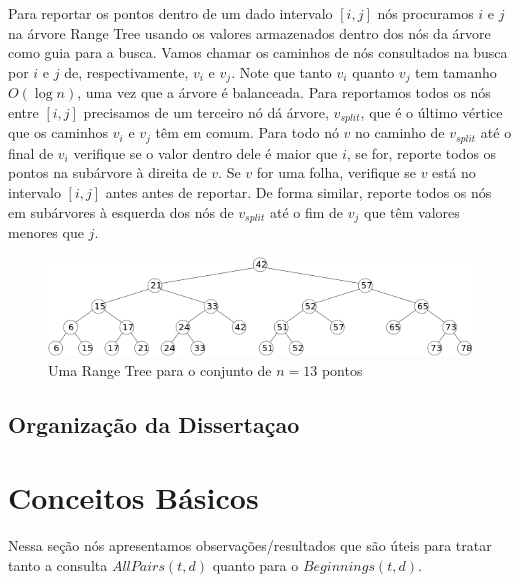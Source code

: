 \documentclass[12pt]{article}
\begin{document}
Para reportar os pontos dentro de um dado intervalo
$[i, j]$ nós procuramos $i$ e $j$ na árvore Range Tree usando 
os valores armazenados dentro dos nós da árvore como guia para a busca.
Vamos chamar os caminhos de nós consultados na busca por $i$ e $j$
de, respectivamente, $v_i$ e $v_j$. Note que tanto $v_i$ quanto $v_j$
tem tamanho $O(\log n)$, uma vez que a árvore é balanceada. Para
reportamos todos os nós entre $[i, j]$ precisamos de um terceiro nó
dá árvore, $v_{split}$, que é o último vértice que os caminhos $v_i$
e $v_j$ têm em comum. Para todo nó $v$ no caminho de $v_{split}$ até o 
final de $v_i$ verifique se o valor dentro dele é maior que $i$, se 
for, reporte todos os pontos na subárvore à direita de $v$. Se $v$
for uma folha, verifique se $v$ está no intervalo $[i, j]$ antes
antes de reportar. De forma similar, reporte todos os nós em 
subárvores à esquerda dos nós de $v_{split}$ até o fim de $v_j$
que têm valores menores que $j$.  


\begin{figure}[htp]
\begin{center}
\includegraphics[scale=0.5]{range_tree.png}
\caption{Uma Range Tree para o conjunto de $n=13$ pontos}
\label{fig:rangeTree}
\end{center}
\end{figure}



\subsection{Organização da Dissertaçao}

\section{Conceitos Básicos}


Nessa seção nós apresentamos observações/resultados que são úteis para tratar
tanto a consulta $AllPairs(t, d)$ quanto para o $Beginnings(t, d)$.
\end{document}
